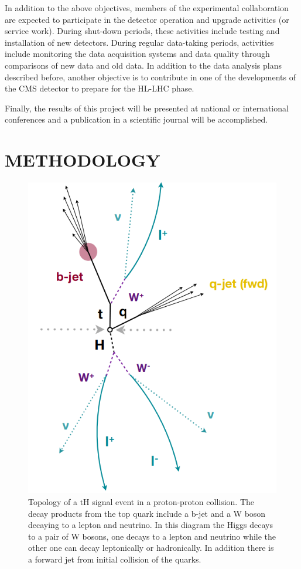 \documentclass[final,3p]{CSP}
\begin{document}
In addition to the above objectives, members of the experimental collaboration are expected to participate in the detector operation and upgrade activities (or service work).
During shut-down periods, these activities include testing and installation of new detectors.
During regular data-taking periods, activities include monitoring the data acquisition systems and data quality through comparisons of new data and old data.
In addition to the data analysis plans described before, another objective is to contribute in one of the developments of the CMS detector to  prepare for the HL-LHC phase.
%

Finally, the results of this project will be presented at national or international conferences and a publication in a scientific journal will be accomplished.


\section{METHODOLOGY}


\begin{figure}[ht]
	\centering
	\includegraphics[width=0.6\columnwidth]{./topology.png}
	\caption{Topology of a tH signal event in a proton-proton collision. The decay products from the top quark include a b-jet and a W boson decaying to a lepton and neutrino. In this diagram the Higgs decays to a pair of W bosons, one decays to a lepton and neutrino while the other one can decay leptonically or hadronically. In addition there is a forward jet from initial collision of the quarks.}
	\label{figureTopology}
\end{figure}
\end{document}
